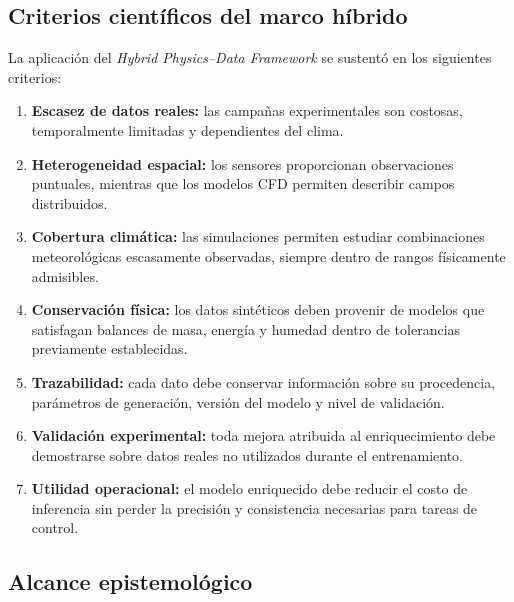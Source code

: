 \subsection{Criterios científicos del marco híbrido}
\label{subsec:criterios_cientificos_hybrid}

La aplicación del \textit{Hybrid Physics--Data Framework} se sustentó en los siguientes criterios:

\begin{enumerate}
    \item \textbf{Escasez de datos reales:} las campañas experimentales son costosas, temporalmente limitadas y dependientes del clima.
    
    \item \textbf{Heterogeneidad espacial:} los sensores proporcionan observaciones puntuales, mientras que los modelos CFD permiten describir campos distribuidos.
    
    \item \textbf{Cobertura climática:} las simulaciones permiten estudiar combinaciones meteorológicas escasamente observadas, siempre dentro de rangos físicamente admisibles.
    
    \item \textbf{Conservación física:} los datos sintéticos deben provenir de modelos que satisfagan balances de masa, energía y humedad dentro de tolerancias previamente establecidas.
    
    \item \textbf{Trazabilidad:} cada dato debe conservar información sobre su procedencia, parámetros de generación, versión del modelo y nivel de validación.
    
    \item \textbf{Validación experimental:} toda mejora atribuida al enriquecimiento debe demostrarse sobre datos reales no utilizados durante el entrenamiento.
    
    \item \textbf{Utilidad operacional:} el modelo enriquecido debe reducir el costo de inferencia sin perder la precisión y consistencia necesarias para tareas de control.
\end{enumerate}

\subsection{Alcance epistemológico}
\label{subsec:alcance_epistemologico_hybrid}

